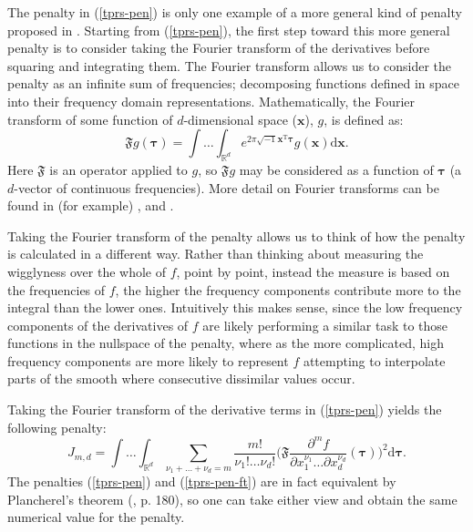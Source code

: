 The penalty in (\ref{tprs-pen}) is only one example of a more general kind of penalty proposed in \cite{duchon77}. Starting from (\ref{tprs-pen}), the first step toward this more general penalty is to consider taking the Fourier transform of the derivatives before squaring and integrating them. The Fourier transform allows us to consider the penalty as an infinite sum of frequencies; decomposing functions defined in space into their frequency domain representations. Mathematically, the Fourier transform of some function of $d$-dimensional space ($\mathbf{x}$), $g$, is defined as:
\begin{equation*}
\mathfrak{F} g(\boldsymbol{\tau}) = \int \ldots \int_{\mathbb{R}^d} e^{2 \pi \sqrt{-1} \mathbf{x}^\text{T} \boldsymbol{\tau}} g(\mathbf{x}) \text{d}\mathbf{x}.
\end{equation*}
Here $\mathfrak{F}$ is an operator applied to $g$, so $\mathfrak{F}g$ may be considered as a function of $\boldsymbol{\tau}$ (a $d$-vector of continuous frequencies). More detail on Fourier transforms can be found in (for example) \cite{bracewell}, \cite{chu-ft} and \cite{beerends}. 

Taking the Fourier transform of the penalty allows us to think of how the penalty is calculated in a different way. Rather than thinking about measuring the wigglyness over the whole of $f$, point by point, instead the measure is based on the frequencies of $f$, the higher the frequency components contribute more to the integral than the lower ones. Intuitively this makes sense, since the low frequency components of the derivatives of $f$ are likely performing a similar task to those functions in the nullspace of the penalty, where as the more complicated, high frequency components are more likely to represent $f$ attempting to interpolate parts of the smooth where consecutive dissimilar values occur.

Taking the Fourier transform of the derivative terms in (\ref{tprs-pen}) yields the following penalty:
\begin{equation}
J_{m,d} = \int \ldots \int_{\mathbb{R}^d} \sum_{\nu_1 + \dots + \nu_d=m} \frac{m!}{\nu_1! \dots \nu_d!}\Big( \mathfrak{F} \frac{\partial^m f}{\partial x_1^{\nu_1} \ldots  \partial x_d^{\nu_d}}(\boldsymbol{\tau}) \Big)^2 \text{d} \boldsymbol{\tau}.
\label{tprs-pen-ft}
\end{equation}
The penalties (\ref{tprs-pen}) and (\ref{tprs-pen-ft}) are in fact equivalent by Plancherel's theorem (\cite{vretblad}, p. 180), so one can take either view and obtain the same numerical value for the penalty.

